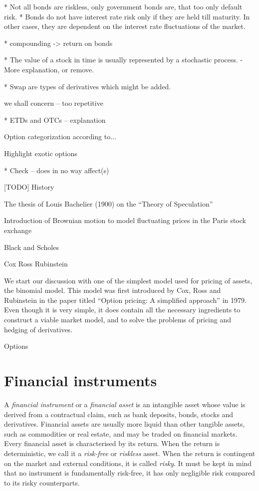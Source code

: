 
* Not all bonds are riskless, only government bonds are, that too only default risk.
* Bonds do not have interest rate risk only if they are held till maturity. In other cases, they are dependent on the interest rate fluctuations of the market.

* compounding -> return on bonds

* The value of a stock in time is usually represented by a stochastic process. - More explanation, or remove.

* Swap are types of derivatives which might be added.

we shall concern -- too repetitive

* ETDs and OTCs -- explanation

Option categorization according to...

Highlight exotic options

* Check -- does in no way affect(s)


[TODO] History

The thesis of Louis Bachelier (1900) on the ``Theory of Speculation”

Introduction of Brownian motion to model fluctuating prices in the Paris stock exchange

Black and Scholes

Cox Ross Rubinstein

We start our discussion with one of the simplest model used for pricing of assets, the binomial model. This model was first introduced by Cox, Ross and Rubinstein \cite{Cox1979} in the paper titled ``Option pricing: A simplified approach'' in 1979. Even though it is very simple, it does contain all the necessary ingredients to construct a viable market model, and to solve the problems of pricing and hedging of derivatives.

Options

\section{Financial instruments}
\label{sec:intro-assets}

A \emph{financial instrument} or a \emph{financial asset} is an intangible asset whose value is derived from a contractual claim, such as bank deposits, bonds, stocks and derivatives. Financial assets are usually more liquid than other tangible assets, such as commodities or real estate, and may be traded on financial markets. Every financial asset is characterised by its return. When the return is deterministic, we call it a \emph{risk-free} or \emph{riskless} asset. When the return is contingent on the market and external conditions, it is called \emph{risky}. It must be kept in mind that no instrument is fundamentally risk-free, it has only negligible risk compared to its risky counterparts.



